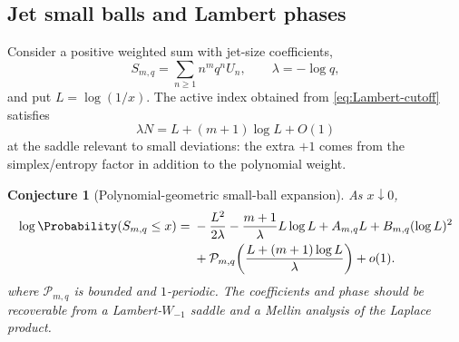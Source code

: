 \documentclass[11pt,a4paper]{article}
\newtheorem{conjecture}[theorem]{Conjecture}
\theoremstyle{definition}
\theoremstyle{remark}
\begin{document}
\subsection{Jet small balls and Lambert phases}

Consider a positive weighted sum with jet-size coefficients,
\begin{equation}
  S_{m,q}=\sum_{n\ge1}n^mq^nU_n,
  \qquad \lambda=-\log q,
  \label{eq:Smq}
\end{equation}
and put $L=\log(1/x)$.  The active index obtained from \eqref{eq:Lambert-cutoff} satisfies
\[
  \lambda N=L+(m+1)\log L+O(1)
\]
at the saddle relevant to small deviations: the extra $+1$ comes from the simplex/entropy factor in addition to the polynomial weight.

\begin{conjecture}[Polynomial-geometric small-ball expansion]
\label{conj:jet-small-ball}
As $x\downarrow0$,
\begin{equation}
\begin{split}
 \log\Probability(S_{m,q}\le x)
  ={}&-\frac{L^2}{2\lambda}
   -\frac{m+1}{\lambda}L\log L
   +A_{m,q}L+B_{m,q}(\log L)^2\\
   &+\mathcal P_{m,q}\!\left(
       \frac{L+(m+1)\log L}{\lambda}\right)+o(1).
\end{split}
 \label{eq:small-ball-conjecture}
\end{equation}
where $\mathcal P_{m,q}$ is bounded and $1$-periodic.  The coefficients and phase should be recoverable from a Lambert-$W_{-1}$ saddle and a Mellin analysis of the Laplace product.
\end{conjecture}
\end{document}
